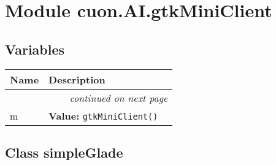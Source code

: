 %
%
%


\section{Module cuon.AI.gtkMiniClient}

    \label{cuon:AI:gtkMiniClient}


  \subsection{Variables}

    \vspace{-1cm}
\hspace{\varindent}\begin{longtable}{|p{\varnamewidth}|p{\vardescrwidth}|l}
\cline{1-2}
\cline{1-2} \centering \textbf{Name} & \centering \textbf{Description}& \\
\cline{1-2}
\endhead\cline{1-2}\multicolumn{3}{r}{\small\textit{continued on next page}}\\\endfoot\cline{1-2}
\endlastfoot\raggedright m\- & \raggedright \textbf{Value:} 
{\tt gtkMiniClient()}&\\
\cline{1-2}
\end{longtable}



\subsection{Class simpleGlade}

